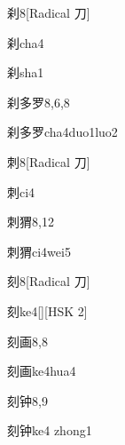 \begin{entry}{刹}{8}[Radical 刀]
  \begin{phonetics}{刹}{cha4}
  \end{phonetics}
  \begin{phonetics}{刹}{sha1}
  \end{phonetics}
\end{entry}

\begin{entry}{刹多罗}{8,6,8}
  \begin{phonetics}{刹多罗}{cha4duo1luo2}
  \end{phonetics}
\end{entry}

\begin{entry}{刺}{8}[Radical 刀]
  \begin{phonetics}{刺}{ci4}
  \end{phonetics}
\end{entry}

\begin{entry}{刺猬}{8,12}
  \begin{phonetics}{刺猬}{ci4wei5}
  \end{phonetics}
\end{entry}

\begin{entry}{刻}{8}[Radical 刀]
  \begin{phonetics}{刻}{ke4}[][HSK 2]
  \end{phonetics}
\end{entry}

\begin{entry}{刻画}{8,8}
  \begin{phonetics}{刻画}{ke4hua4}
  \end{phonetics}
\end{entry}

\begin{entry}{刻钟}{8,9}
  \begin{phonetics}{刻钟}{ke4 zhong1}
  \end{phonetics}
\end{entry}


